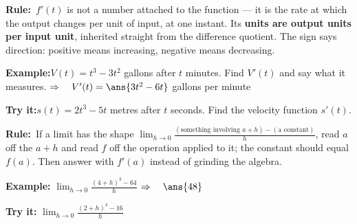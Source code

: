 \documentclass[12pt]{article}
\begin{document}

\begin{formulabox}\textbf{Rule:}\ $f'(t)$ is not a number attached to the
function --- it is the rate at which the output changes per unit of input, at
one instant. Its \textbf{units are output units per input unit}, inherited
straight from the difference quotient. The sign says direction: positive means
increasing, negative means decreasing.
\end{formulabox}

\begin{examplebox}\textbf{Example:}\quad $V(t) = t^3 - 3t^2$ gallons after $t$
minutes. Find $V'(t)$ and say what it measures.
$\Rightarrow\quad V'(t) = \ans{3t^2-6t}$ gallons per minute
\end{examplebox}

\begin{tryitbox}\textbf{Try it:}\quad $s(t) = 2t^3 - 5t$ metres after $t$
seconds. Find the velocity function $s'(t)$.\\[2pt]
\end{tryitbox}


\begin{formulabox}\textbf{Rule:}\ If a limit has the shape
$\lim_{h \to 0} \frac{(\text{something involving } a+h) - (\text{a constant})}{h}$,
read $a$ off the $a+h$ and read $f$ off the operation applied to it; the
constant should equal $f(a)$. Then answer with $f'(a)$ instead of grinding the
algebra.
\end{formulabox}

\begin{examplebox}\textbf{Example:}\quad
$\displaystyle \lim_{h \to 0} \frac{(4+h)^3 - 64}{h}$
$\Rightarrow\quad \ans{48}$
\end{examplebox}

\begin{tryitbox}\textbf{Try it:}\quad
$\displaystyle \lim_{h \to 0} \frac{(2+h)^4 - 16}{h}$\\[2pt]
\end{tryitbox}
\end{document}
